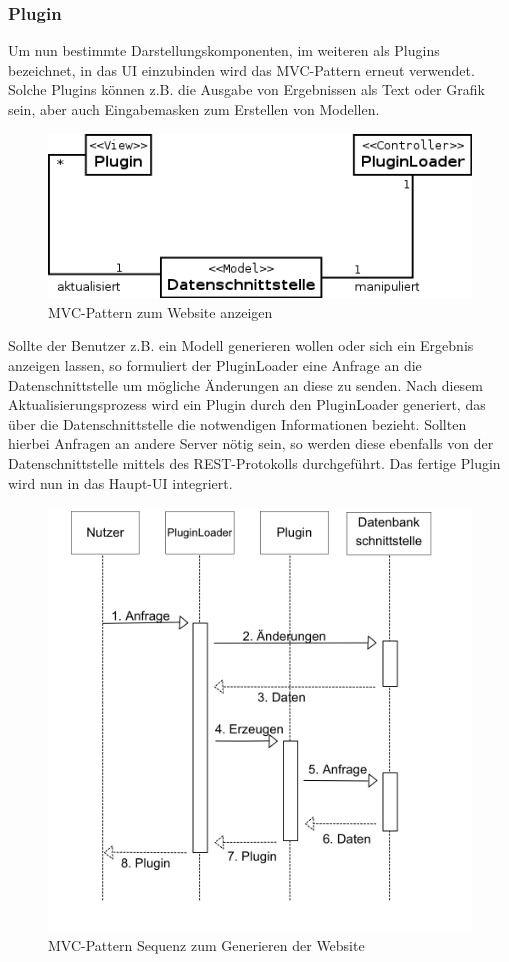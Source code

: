 \clearpage

\subsubsection{Plugin}
Um nun bestimmte Darstellungskomponenten, im weiteren als Plugins bezeichnet, in das UI einzubinden wird das MVC-Pattern erneut verwendet. Solche Plugins können z.B. die Ausgabe von Ergebnissen als Text oder Grafik sein, aber auch Eingabemasken zum Erstellen von Modellen.

\begin{figure}[h]
\centering
\includegraphics[width=0.6\linewidth]{Grafik/Diagramm/Pattern/MVC/Plugin/Kontextdiagramm.png}
\caption[MVC Website Klassen]{MVC-Pattern zum Website anzeigen}
\end{figure}

\noindent Sollte der Benutzer z.B. ein Modell generieren wollen oder sich ein Ergebnis anzeigen lassen, so formuliert der PluginLoader eine Anfrage an die Datenschnittstelle um mögliche Änderungen an diese zu senden. Nach diesem Aktualisierungsprozess wird ein Plugin durch den PluginLoader generiert, das über die Datenschnittstelle die notwendigen Informationen bezieht. Sollten hierbei Anfragen an andere Server nötig sein, so werden diese ebenfalls von der Datenschnittstelle mittels des REST-Protokolls durchgeführt. 
Das fertige Plugin wird nun in das Haupt-UI integriert.

\begin{figure}[h]
\centering
\includegraphics[width=0.6\linewidth]{Grafik/Diagramm/Pattern/MVC/Plugin/Sequenzdiagramm.png}
\caption[MVC Website Sequenz]{MVC-Pattern Sequenz zum Generieren der Website}
\end{figure}

